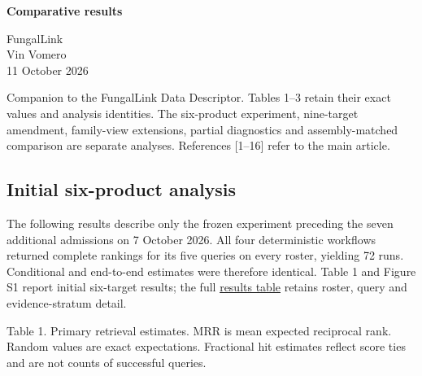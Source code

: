 \documentclass[
  10pt,
  a4paper,
]{article}
\author{}
\date{}
\begin{document}
\begin{center}{\LARGE\bfseries\color{ink}Comparative results\par}\vspace{6pt}
{\large FungalLink}\\[4pt]
Vin Vomero\\[4pt]
11 October 2026\end{center}
\vspace{8pt}
\renewcommand{\thefigure}{S\arabic{figure}}

Companion to the FungalLink Data Descriptor. Tables 1--3 retain their exact values and analysis identities. The six-product experiment, nine-target amendment, family-view extensions, partial diagnostics and assembly-matched comparison are separate analyses. References {[}1--16{]} refer to the main article.

\subsection{Initial six-product analysis}\label{initial-six-product-analysis}

The following results describe only the frozen experiment preceding the seven additional admissions on 7 October 2026. All four deterministic workflows returned complete rankings for its five queries on every roster, yielding 72 runs. Conditional and end-to-end estimates were therefore identical. Table 1 and Figure S1 report initial six-target results; the full \href{https://github.com/vinvomero/fungallink-benchmark/blob/main/manuscript/initial-comparison-results-2026-10-07.tsv}{results table} retains roster, query and evidence-stratum detail.

Table 1. Primary retrieval estimates. MRR is mean expected reciprocal rank. Random values are exact expectations. Fractional hit estimates reflect score ties and are not counts of successful queries.
\end{document}
